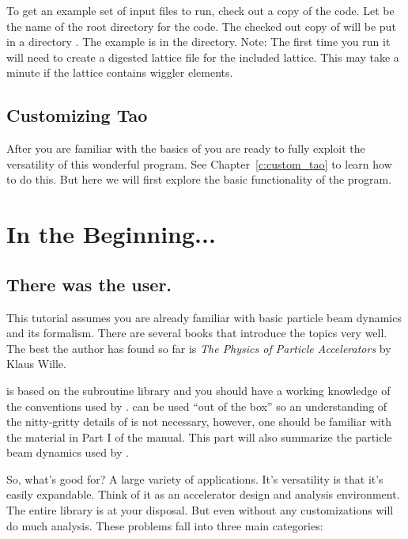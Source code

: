 To get an example set of input files to run, check out a copy of the
\tao code. Let  be the name of the root directory for the
code. The checked out copy of \tao will be put in a directory
. The example is in the  directory.
Note: The first time you run \tao it will need to create a digested
\bmad lattice file for the included lattice. This may take a minute if
the lattice contains wiggler elements.

\subsection{Customizing Tao}

After you are familiar with the basics of \tao you are ready to fully
exploit the versatility of this wonderful program. See
Chapter~\ref{c:custom_tao} to learn how to do this. But here we will
first explore the basic functionality of the program.

\section{In the Beginning...}
\label{s:beginning}

\subsection{There was the user.}

This tutorial assumes you are already familiar with basic particle
beam dynamics and its formalism. There are several books that
introduce the topics very well. The best the author has found so far
is \textit{The Physics of Particle Accelerators} by Klaus Wille.

\tao is based on the \bmad subroutine library and you should have a
working knowledge of the conventions used by \bmad. \tao can be used
``out of the box'' so an understanding of the nitty-gritty details of
\bmad is not necessary, however, one should be familiar with the
material in Part I of the \bmad manual. This part will also summarize
the particle beam dynamics used by \tao.

So, what's \tao good for? A large variety of applications. It's
versatility is that it's easily expandable. Think of it as an
accelerator design and analysis environment. The entire \bmad library
is at your disposal. But even without any customizations \tao will do
much analysis. These problems fall into three main categories:

